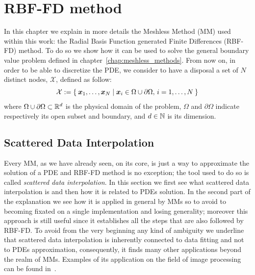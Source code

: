 \chapter{RBF-FD method}


In this chapter we explain in more details the Meshless Method (MM) used within this work: the Radial Basis Function generated Finite Differences (RBF-FD) method.
To do so we show how it can be used to solve the general boundary value problem defined in chapter~\ref{chap:meshless_methods}.
From now on, in order to be able to discretize the PDE, we consider to have a disposal a set of $N$ distinct nodes, $\mathcal{X}$, defined as follow:
\begin{equation}
\label{eqn:generic_set_of_nodes_X}
	\mathcal{X} := \Set{\boldsymbol{x}_1, \dots, \boldsymbol{x}_N \mid \boldsymbol{x}_i \in \Omega\cup\partial\Omega, \, i=1, \dots, N}
\end{equation}
where $\Omega\cup\partial\Omega \subset \mathbb{R}^d$ is the physical domain of the problem, $\Omega$ and $\partial\Omega$ indicate respectively its open subset and boundary, and $d \in \mathbb{N}$ is its dimension.




\section{Scattered Data Interpolation}
\label{sec:scattered_data_interpolation}

Every MM, as we have already seen, on its core, is just a way to approximate the solution of a PDE and RBF-FD method is no exception; the tool used to do so is called \emph{scattered data interpolation}. In this section we first see what scattered data interpolation is and then how it is related to PDEs solution. In the second part of the explanation we see how it is applied in general by MMs so to avoid to becoming fixated on a single implementation and losing generality; moreover this approach is still useful since it establishes all the steps that are also followed by RBF-FD.
To avoid from the very beginning any kind of ambiguity we underline that scattered data interpolation is inherently connected to data fitting and not to PDEs approximation, consequently, it finds many other applications beyond the realm of MMs. Examples of its application on the field of image processing can be found in~\cite{Amidror:scattered_data_interpolation_in_image_processing}.


